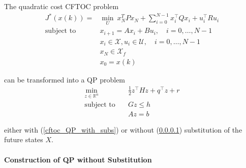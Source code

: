 \newpar{}

The quadratic cost CFTOC problem
\begin{align*}
    J^*(x(k)) =            & \min_U \: x_N^T P x_N + \sum_{i=0}^{N-1}x_i^\top Q x_i + u_i^\top R u_i \\
    \text{subject to}\quad & x_{i+1} = Ax_i +Bu_i, \quad i = 0, \ldots, N-1                          \\
                           & x_i \in \mathcal{X}, u_i \in \mathcal{U}, \quad i = 0, \ldots, N-1      \\
                           & x_N \in \mathcal{X}_f                                                   \\
                           & x_0 = x(k)
\end{align*}

can be transformed into a QP problem
\begin{align*}
    \min_{z\in\mathbb{R}^n} & \frac{1}{2}z^\top Hz + q^\top z + r \\
    \text{subject to}\quad  & Gz \leq h                           \\
                            & Az = b
\end{align*}

either with (\ref{cftoc_QP_with_subs}) or without (\ref{cftoc_QP_without_subs}) substitution of the future states $X$.

\paragraph{Construction of QP without Substitution}\label{cftoc_QP_without_subs}

